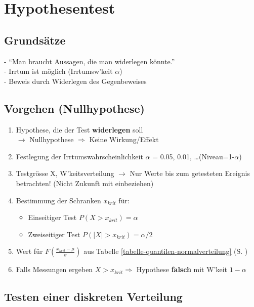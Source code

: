 \newpage
\section{Hypothesentest \skript{\pageref{sk-chapter-hypothesen-testen}}}
	\subsection{Grundsätze}
	- ``Man braucht Aussagen, die man widerlegen könnte.''\\
	- Irrtum ist möglich (Irrtumsw'keit $\alpha$)\\
	- Beweis durch Widerlegen des Gegenbeweises
	\subsection{Vorgehen (Nullhypothese)}
	\begin{enumerate}
      \item Hypothese, die der Test \textbf{widerlegen} soll\\
      	$\rightarrow$ Nullhypothese $\Rightarrow$ Keine Wirkung/Effekt
      \item Festlegung der Irrtumswahrscheinlichkeit 	$\alpha$ = 0.05, 0.01, \ldots (Niveau=1-$\alpha$)
      \item Testgrösse X, W'keitsverteilung
      	$\rightarrow$ Nur Werte bis zum getesteten Ereignis betrachten! (Nicht Zukunft mit einbeziehen)
      \item Bestimmung der Schranken $x_{krit}$ für: 		
      	\begin{itemize}
      		\item Einseitiger Test $P(X > x_{krit})=\alpha$
      		\item Zweiseitiger Test $P(|X| > x_{krit})=\alpha/2$
      	\end{itemize}
      \item Wert für $F\!\left({\frac{x_{krit}-\mu}{\sigma}}\right)$ aus Tabelle \ref{tabelle-quantilen-normalverteilung} (S. \pageref{tabelle-quantilen-normalverteilung})
      \item Falls Messungen ergeben $X > x_{krit} \Longrightarrow$ Hypothese
      \textbf{falsch} mit W'keit $1-\alpha$
    \end{enumerate}
    

	\subsection{Testen einer diskreten Verteilung
	\skript{\pageref{sk-section-testen-diskreter-wkeitsverteilung}}}
